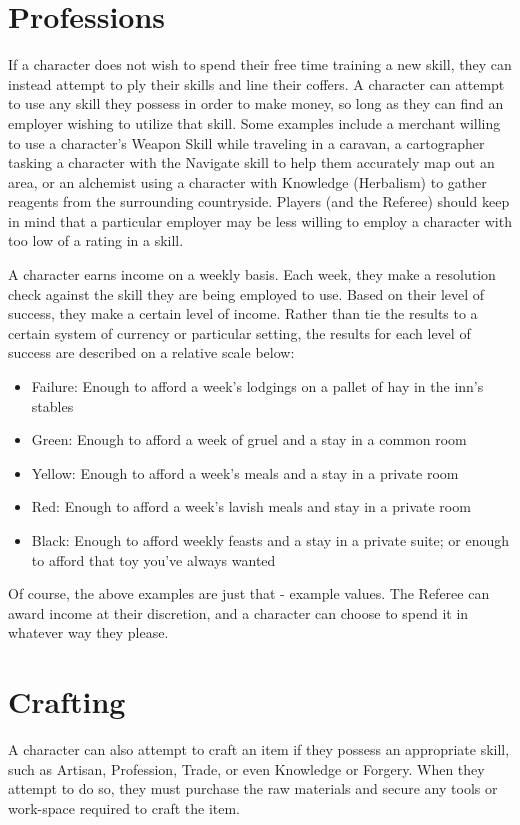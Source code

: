 \documentclass[oneside]{book}
\begin{document}
\begin{multicols}{2}
\section{Professions}

If a character does not wish to spend their free time training a new skill, they can instead attempt to ply their skills and line their coffers. A character can attempt to use any skill they possess in order to make money, so long as they can find an employer wishing to utilize that skill. Some examples include a merchant willing to use a character's Weapon Skill while traveling in a caravan, a cartographer tasking a character with the Navigate skill to help them accurately map out an area, or an alchemist using a character with Knowledge (Herbalism) to gather reagents from the surrounding countryside. Players (and the Referee) should keep in mind that a particular employer may be less willing to employ a character with too low of a rating in a skill. 

A character earns income on a weekly basis. Each week, they make a resolution check against the skill they are being employed to use. Based on their level of success, they make a certain level of income. Rather than tie the results to a certain system of currency or particular setting, the results for each level of success are described on a relative scale below:  

\begin{itemize}
		\setlength{\itemsep}{0cm}%
  		\setlength{\parskip}{0cm}%
		\item{Failure: Enough to afford a week's lodgings on a pallet of hay in the inn's stables }
		\item{Green: Enough to afford a week of gruel and a stay in a common room }
		\item{Yellow: Enough to afford a week's meals and a stay in a private room }
		\item{Red: Enough to afford a week's lavish meals and stay in a private room }
		\item{Black: Enough to afford weekly feasts and a stay in a private suite; or enough to afford that toy you've always wanted}
	\end{itemize}

Of course, the above examples are just that - example values. The Referee can award income at their discretion, and a character can choose to spend it in whatever way they please. 

\section{Crafting}
A character can also attempt to craft an item if they possess an appropriate skill, such as Artisan, Profession, Trade, or even Knowledge or Forgery. When they attempt to do so, they must purchase the raw materials and secure any tools or work-space required to craft the item.


\end{multicols}
\end{document}
